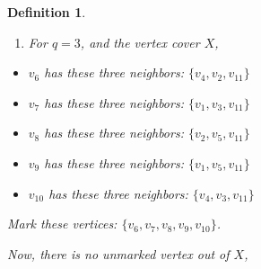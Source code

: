 \documentclass[12pt]{article}
\theoremstyle{slplain}
\newtheorem{defi}{Definition}[section]
\begin{document}
\begin{defi}
\begin{enumerate}
This kernel can be colored with $3$ and therefore with $4$ colors.

\vspace{1cm}

\begin{center}
\end{center}
\vspace{1cm}


If we consider set $Y$ as vertex cover, then only vertex $v_7$ is out of $Y$ and it doesn't have 4 neighbors in $Y$, hence no 
vertex will be marked and just $v_7$ will be removed, then the kernel is the set 
$\{v_1 , v_2 , v_3 , v_4 , v_5 , v_6 , v_8 , v_9 , v_{10} , v_{11}\}$ which is not as good, due to bigger kernel size.

\item For $q = 3$, and the vertex cover $X$,
\end{enumerate}

\begin{itemize}
\item $v_6$ has these three neighbors: $\{v_4 , v_2 , v_{11}\}$

\item $v_7$ has these three neighbors: $\{v_1 , v_3 , v_{11}\}$

\item $v_8$ has these three neighbors: $\{v_2 , v_5 , v_{11}\}$ 

\item $v_9$ has these three neighbors: $\{v_1 , v_5 , v_{11}\}$

\item $v_{10}$ has these three neighbors: $\{v_4 , v_3 , v_{11}\}$ 
\end{itemize}

Mark these vertices: $\{v_6, v_7, v_8, v_9, v_{10}\}$.


Now, there is no unmarked vertex out of $X$,


\end{defi}
\end{document}
